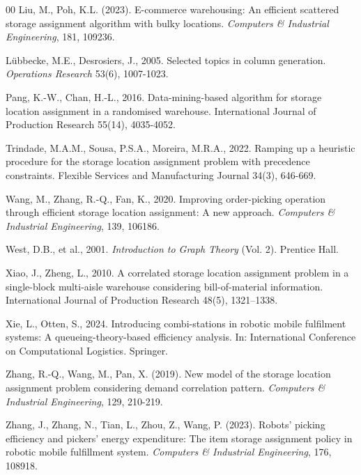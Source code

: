 \documentclass[11pt]{elsarticle}
\begin{document}
\begin{thebibliography}{00}
Liu, M., Poh, K.L. (2023).
E-commerce warehousing: An efficient scattered storage assignment algorithm with bulky locations.
\textit{Computers \& Industrial Engineering}, 181, 109236.

L{\"u}bbecke, M.E., Desrosiers, J., 2005. Selected topics in column generation.
\textit{Operations Research} 53(6), 1007-1023. 

Pang, K.-W., Chan, H.-L., 2016. Data-mining-based algorithm for storage location assignment in a randomised warehouse. International Journal of Production Research 55(14), 4035-4052.


Trindade, M.A.M., Sousa, P.S.A., Moreira, M.R.A., 2022. Ramping up a heuristic procedure for the storage location assignment problem with precedence constraints. Flexible Services and Manufacturing Journal 34(3), 646-669.

Wang, M., Zhang, R.-Q., Fan, K., 2020. Improving order-picking operation through efficient storage location assignment: A new approach. \textit{Computers \& Industrial Engineering}, 139, 106186.

West, D.B., et al., 2001. \textit{Introduction to Graph Theory} (Vol. 2). Prentice Hall.

Xiao, J., Zheng, L., 2010. A correlated storage location assignment problem in a single-block multi-aisle warehouse considering bill-of-material information. International Journal of Production Research 48(5), 1321--1338.

Xie, L., Otten, S., 2024. Introducing combi-stations in robotic mobile fulfilment systems: A queueing-theory-based efficiency analysis. In: International Conference on Computational Logistics. Springer.

Zhang, R.-Q., Wang, M., Pan, X. (2019).
New model of the storage location assignment problem considering demand correlation pattern.
\textit{Computers \& Industrial Engineering}, 129, 210-219.


Zhang, J., Zhang, N., Tian, L., Zhou, Z., Wang, P. (2023).
Robots’ picking efficiency and pickers’ energy expenditure: The item storage assignment policy in robotic mobile fulfillment system.
\textit{Computers \& Industrial Engineering}, 176, 108918.




\end{thebibliography}
\end{document}
